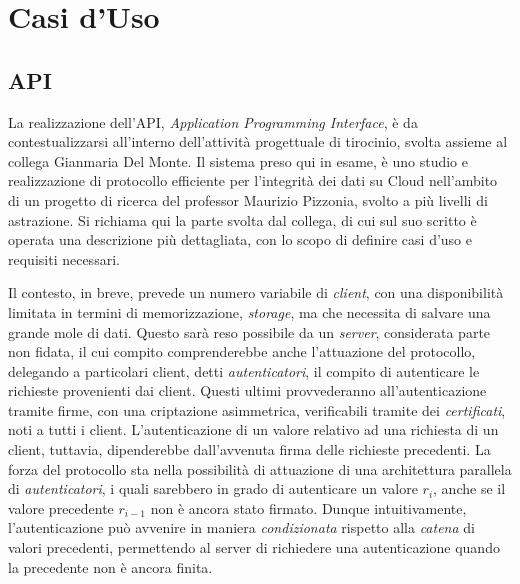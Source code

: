\section{Casi d'Uso}


	\subsection{API}

	La realizzazione dell'API, \textit{Application Programming Interface}, è da contestualizzarsi all'interno dell'attività progettuale di tirocinio, svolta assieme al collega Gianmaria Del Monte. Il sistema preso qui in esame, è uno studio e realizzazione di protocollo efficiente per l'integrità dei dati su Cloud nell'ambito di un progetto di ricerca \cite{main_project} del professor Maurizio Pizzonia, svolto a più livelli di astrazione. Si richiama qui la parte svolta dal collega, di cui sul suo scritto \cite{pipelineintegrity_thesis} è operata una descrizione più dettagliata, con lo scopo di definire casi d'uso e requisiti necessari.
	
	Il contesto, in breve, prevede un numero variabile di \textit{client}, con una disponibilità limitata in termini di memorizzazione, \textit{storage}, ma che necessita di salvare una grande mole di dati. Questo sarà reso possibile da un \textit{server}, considerata parte non fidata, il cui compito comprenderebbe anche l'attuazione del protocollo, delegando a particolari client, detti \textit{autenticatori}, il compito di autenticare le richieste provenienti dai client. Questi ultimi provvederanno all'autenticazione tramite firme, con una criptazione asimmetrica, verificabili tramite dei \textit{certificati}, noti a tutti i client. L'autenticazione di un valore relativo ad una richiesta di un client, tuttavia, dipenderebbe dall'avvenuta firma delle richieste precedenti.
	La forza del protocollo sta nella possibilità di attuazione di una architettura parallela di \textit{autenticatori}, i quali sarebbero in grado di autenticare un valore $ r_{i} $, anche se il valore precedente $ r_{i-1} $ non è ancora stato firmato. Dunque intuitivamente, l'autenticazione può avvenire in maniera \textit{condizionata} rispetto alla \textit{catena} di valori precedenti, permettendo al server di richiedere una autenticazione quando la precedente non è ancora finita.
	
